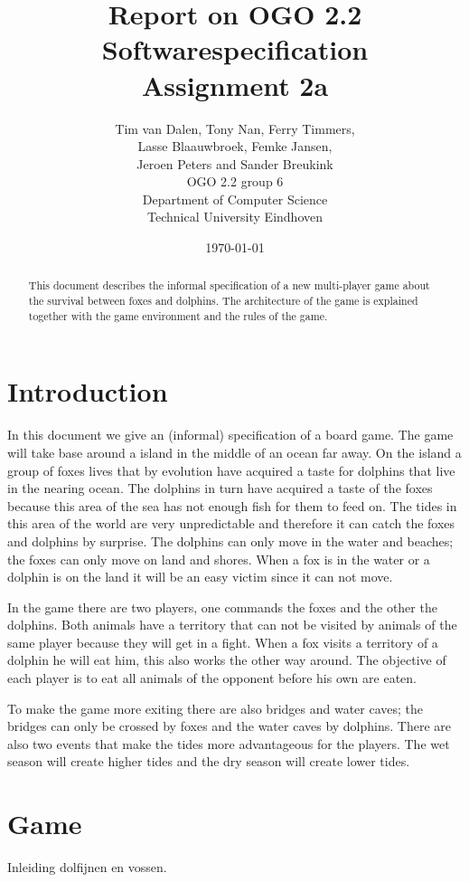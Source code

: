 \documentclass[12pt]{article}
\title{Report on OGO 2.2 Softwarespecification\\ Assignment 2a}
\author{
        Tim van Dalen, Tony Nan, Ferry Timmers, \\ Lasse Blaauwbroek, Femke Jansen, \\Jeroen Peters and Sander Breukink\\ OGO 2.2 group 6 \\
                Department of Computer Science\\
        Technical University Eindhoven\\
}
\date{\today}
\begin{document}
\maketitle

\begin{abstract}
This document describes the informal specification of a new multi-player game about the survival between foxes and dolphins. The architecture of the game is explained together with the game environment and the rules of the game.
\end{abstract}

\section{Introduction}

In this document we give an (informal) specification of a board game.
The game will take base around a island in the middle of an ocean far away. On the island a group of foxes
lives that by evolution have acquired a taste for dolphins that live
in the nearing ocean. The dolphins in turn have acquired a taste of
the foxes because this area of the sea has not enough fish for them
to feed on. The tides in this area of the world are very unpredictable
and therefore it can catch the foxes and dolphins by surprise. The
dolphins can only move in the water and beaches; the foxes can only
move on land and shores. When a fox is in the water or a dolphin is
on the land it will be an easy victim since it can not move.

In the game there are two players, one commands the foxes and the
other the dolphins. Both animals have a territory that can not be
visited by animals of the same player because they will get in a fight.
When a fox visits a territory of a dolphin he will eat him, this also
works the other way around. The objective of each player is to eat
all animals of the opponent before his own are eaten.

To make the game more exiting there are also bridges and water caves;
the bridges can only be crossed by foxes and the water caves by dolphins.
There are also two events that make the tides more advantageous for
the players. The wet season will create higher tides and the dry season
will create lower tides.

\section{Game}

Inleiding dolfijnen en vossen.
\end{document}

